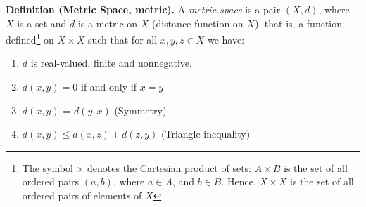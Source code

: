 \documentclass[9pt]{article}
\begin{document}
 \Working

\textbf{Definition (Metric Space, metric).} A \textit{metric space} is a pair $(X,d)$, where $X$ is a set and $d$ is a metric on $X$ (distance function on $X$), that is, a function defined\footnote[1]{The symbol $\times$ denotes the Cartesian product of sets: $A \times B$ is the set of all ordered pairs $(a,b)$, where $a \in A$, and $b \in B$. Hence, $X \times X$ is the set of all ordered pairs of elements of $X$} on $X \times X$ such that for all $x,y,z \in X$ we have:
\begin{enumerate}
\item $d$ is real-valued, finite and nonnegative.
\item $d(x,y) = 0$ if and only if $x=y$
\item $d(x,y)$ = $d(y,x)$  (Symmetry)
\item $d(x,y) \le d(x,z) + d(z,y)$   (Triangle inequality)
\end{enumerate}
\end{document}
